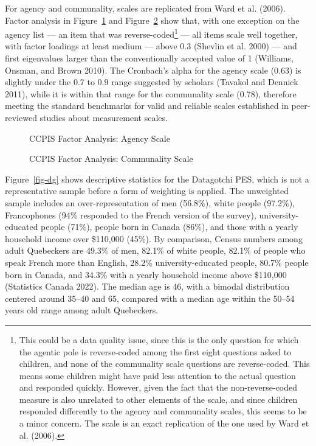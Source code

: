 \documentclass[
  letterpaper,
  DIV=11,
  numbers=noendperiod]{scrreprt}
\begin{document}
For agency and communality, scales are replicated from Ward et al.
(2006). Factor analysis in Figure~\ref{fig-factor1} and
Figure~\ref{fig-factor2} show that, with one exception on the agency
list --- an item that was reverse-coded\footnote{This could be a data
  quality issue, since this is the only question for which the agentic
  pole is reverse-coded among the first eight questions asked to
  children, and none of the communality scale questions are
  reverse-coded. This means some children might have paid less attention
  to the actual question and responded quickly. However, given the fact
  that the non-reverse-coded measure is also unrelated to other elements
  of the scale, and since children responded differently to the agency
  and communality scales, this seems to be a minor concern. The scale is
  an exact replication of the one used by Ward et al. (2006).} --- all
items scale well together, with factor loadings at least medium ---
above 0.3 (Shevlin et al. 2000) --- and first eigenvalues larger than
the conventionally accepted value of 1 (Williams, Onsman, and Brown
2010). The Cronbach's alpha for the agency scale (0.63) is slightly
under the 0.7 to 0.9 range suggested by scholars (Tavakol and Dennick
2011), while it is within that range for the communality scale (0.78),
therefore meeting the standard benchmarks for valid and reliable scales
established in peer-reviewed studies about measurement scales.

\begin{figure}


\caption{\label{fig-factor1}CCPIS Factor Analysis: Agency Scale}

\end{figure}%

\begin{figure}


\caption{\label{fig-factor2}CCPIS Factor Analysis: Communality Scale}

\end{figure}%

Figure~\ref{fig-dg} shows descriptive statistics for the Datagotchi PES,
which is not a representative sample before a form of weighting is
applied. The unweighted sample includes an over-representation of men
(56.8\%), white people (97.2\%), Francophones (94\% responded to the
French version of the survey), university-educated people (71\%), people
born in Canada (86\%), and those with a yearly household income over
\$110,000 (45\%). By comparison, Census numbers among adult Quebeckers
are 49.3\% of men, 82.1\% of white people, 82.1\% of people who speak
French more than English, 28.2\% university-educated people, 80.7\%
people born in Canada, and 34.3\% with a yearly household income above
\$110,000 (Statistics Canada 2022). The median age is 46, with a bimodal
distribution centered around 35--40 and 65, compared with a median age
within the 50--54 years old range among adult Quebeckers.
\end{document}
